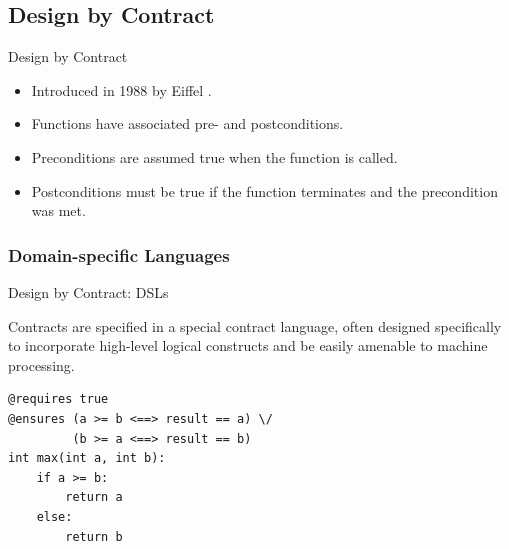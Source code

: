\documentclass[12pt]{beamer}
\begin{document}

\subsection{Design by Contract}
\label{sec:runver-dbc}

\begin{frame}{Design by Contract}

  \begin{itemize}
    \item Introduced in 1988 by Eiffel \parencite{eiffel}.
    \item Functions have associated pre- and postconditions.
    \item Preconditions are assumed true when the function is called.
    \item Postconditions must be true if the function terminates
      and the precondition was met.
  \end{itemize}

\end{frame}

\subsubsection{Domain-specific Languages}
\label{sec:runver-dbc-ann}

\begin{frame}[fragile]{Design by Contract: \small DSLs}

  Contracts are specified in a special contract language, often
  designed specifically to incorporate high-level logical constructs
  and be easily amenable to machine processing.

\begin{verbatim}
@requires true
@ensures (a >= b <==> result == a) \/
         (b >= a <==> result == b)
int max(int a, int b):
    if a >= b:
        return a
    else:
        return b
\end{verbatim}
\end{frame}
\end{document}
